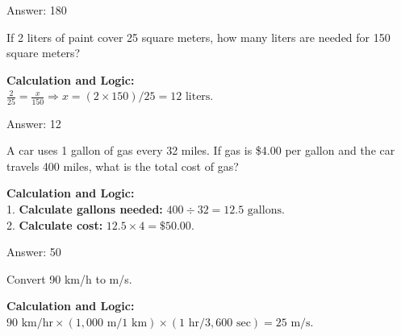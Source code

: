 \documentclass[11pt,paper=a4,answers]{exam}
\begin{document}
\begin{questions}
\begin{solution}
\vspace{30pt}

Answer: \colorbox{yellow!100}{180}
\end{solution}

\vspace{60pt}

\question
If 2 liters of paint cover 25 square meters, how many liters are needed for 150 square meters?

\begin{solution}
\textbf{Calculation and Logic:} \\
$\frac{2}{25} = \frac{x}{150} \Rightarrow x = (2 \times 150) / 25 = 12 \text{ liters}$.

\vspace{30pt}

Answer: \colorbox{yellow!100}{12}
\end{solution}

\vspace{60pt}

\question
A car uses 1 gallon of gas every 32 miles. If gas is \$4.00 per gallon and the car travels 400 miles, what is the total cost of gas?

\begin{solution}
\textbf{Calculation and Logic:} \\
1. \textbf{Calculate gallons needed:} $400 \div 32 = 12.5 \text{ gallons}$. \\
2. \textbf{Calculate cost:} $12.5 \times 4 = \$50.00$.

\vspace{30pt}

Answer: \colorbox{yellow!100}{50}
\end{solution}

\vspace{60pt}

\question
Convert 90 km/h to m/s.

\begin{solution}
\textbf{Calculation and Logic:} \\
$90 \text{ km/hr} \times (1,000 \text{ m} / 1 \text{ km}) \times (1 \text{ hr} / 3,600 \text{ sec}) = 25 \text{ m/s}$.

\vspace{30pt}


\end{solution}
\end{questions}
\end{document}
